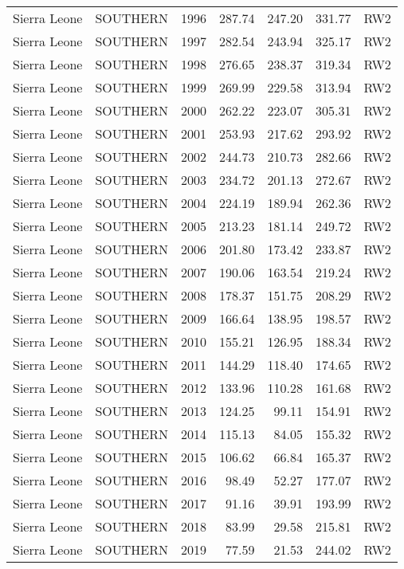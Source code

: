 \begin{longtable}{lllrrrl}
  Sierra Leone & SOUTHERN & 1996 & 287.74 & 247.20 & 331.77 & RW2 \\ 
  Sierra Leone & SOUTHERN & 1997 & 282.54 & 243.94 & 325.17 & RW2 \\ 
  Sierra Leone & SOUTHERN & 1998 & 276.65 & 238.37 & 319.34 & RW2 \\ 
  Sierra Leone & SOUTHERN & 1999 & 269.99 & 229.58 & 313.94 & RW2 \\ 
  Sierra Leone & SOUTHERN & 2000 & 262.22 & 223.07 & 305.31 & RW2 \\ 
  Sierra Leone & SOUTHERN & 2001 & 253.93 & 217.62 & 293.92 & RW2 \\ 
  Sierra Leone & SOUTHERN & 2002 & 244.73 & 210.73 & 282.66 & RW2 \\ 
  Sierra Leone & SOUTHERN & 2003 & 234.72 & 201.13 & 272.67 & RW2 \\ 
  Sierra Leone & SOUTHERN & 2004 & 224.19 & 189.94 & 262.36 & RW2 \\ 
  Sierra Leone & SOUTHERN & 2005 & 213.23 & 181.14 & 249.72 & RW2 \\ 
  Sierra Leone & SOUTHERN & 2006 & 201.80 & 173.42 & 233.87 & RW2 \\ 
  Sierra Leone & SOUTHERN & 2007 & 190.06 & 163.54 & 219.24 & RW2 \\ 
  Sierra Leone & SOUTHERN & 2008 & 178.37 & 151.75 & 208.29 & RW2 \\ 
  Sierra Leone & SOUTHERN & 2009 & 166.64 & 138.95 & 198.57 & RW2 \\ 
  Sierra Leone & SOUTHERN & 2010 & 155.21 & 126.95 & 188.34 & RW2 \\ 
  Sierra Leone & SOUTHERN & 2011 & 144.29 & 118.40 & 174.65 & RW2 \\ 
  Sierra Leone & SOUTHERN & 2012 & 133.96 & 110.28 & 161.68 & RW2 \\ 
  Sierra Leone & SOUTHERN & 2013 & 124.25 & 99.11 & 154.91 & RW2 \\ 
  Sierra Leone & SOUTHERN & 2014 & 115.13 & 84.05 & 155.32 & RW2 \\ 
  Sierra Leone & SOUTHERN & 2015 & 106.62 & 66.84 & 165.37 & RW2 \\ 
  Sierra Leone & SOUTHERN & 2016 & 98.49 & 52.27 & 177.07 & RW2 \\ 
  Sierra Leone & SOUTHERN & 2017 & 91.16 & 39.91 & 193.99 & RW2 \\ 
  Sierra Leone & SOUTHERN & 2018 & 83.99 & 29.58 & 215.81 & RW2 \\ 
  Sierra Leone & SOUTHERN & 2019 & 77.59 & 21.53 & 244.02 & RW2 \\ 

\end{longtable}

